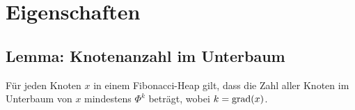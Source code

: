 \section{Eigenschaften} %
\subsection{Lemma: Knotenanzahl im Unterbaum}
Für jeden Knoten $x$ in einem Fibonacci-Heap gilt, dass die Zahl aller Knoten im Unterbaum von $x$ mindestens $\Phi^k$ beträgt, wobei $k = \text{grad}(x)$.
